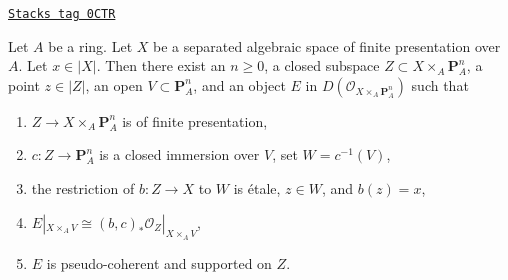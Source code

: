 \begin{lemma}

\label{spaces-more-morphisms-lemma-derived-chow}
\href{https://stacks.math.columbia.edu/tag/0CTR}{\texttt{Stacks tag 0CTR}}

Let $A$ be a ring. Let $X$ be a separated algebraic space
of finite presentation over $A$. Let $x \in |X|$. Then there exist
an $n \geq 0$,
a closed subspace $Z \subset X \times_A \mathbf{P}^n_A$,
a point $z \in |Z|$,
an open $V \subset \mathbf{P}^n_A$, and
an object $E$ in $D(\mathcal{O}_{X \times_A \mathbf{P}^n_A})$ such that
\begin{enumerate}
\item $Z \to X \times_A \mathbf{P}^n_A$ is of finite presentation,
\item $c : Z \to \mathbf{P}^n_A$ is a closed immersion over $V$,
set $W = c^{-1}(V)$,
\item the restriction of $b : Z \to X$ to $W$ is \'etale,
$z \in W$, and $b(z) = x$,
\item $E|_{X \times_A V} \cong
(b, c)_*\mathcal{O}_Z|_{X \times_A V}$,
\item $E$ is pseudo-coherent and supported on $Z$.
\end{enumerate}
\end{lemma}


